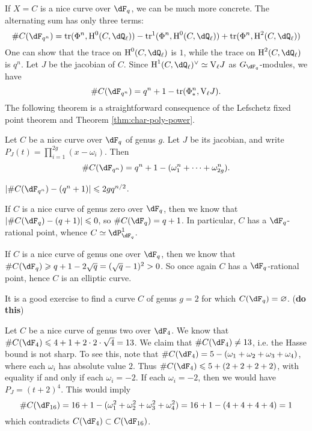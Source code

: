 If $X=C$ is a nice curve over $\dF_q$, we can be much more concrete. The 
alternating sum has only three terms:
\[
  \# C(\dF_{q^n}) = \trace(\Phi^n,\h^0(C,\dQ_\ell)) - \trace^1(\Phi^n,\h^0(C,\dQ_\ell)) + \trace(\Phi^n,\h^2(C,\dQ_\ell))
\]
One can show that the trace on $\h^0(C,\dQ_\ell)$ is $1$, while the trace on 
$\h^2(C,\dQ_\ell)$ is $q^n$. Let $J$ be the jacobian of $C$. Since 
$\h^1(C,\dQ_\ell)^\vee \simeq \vtate_\ell J$ as $G_{\dF_q}$-modules, we have 
\[
  \# C(\dF_{q^n}) = q^n+1 - \trace(\Phi_\ast^n, \vtate_\ell J) \text{.}
\]
The following theorem is a straightforward consequence of the Lefschetz fixed 
point theorem and Theorem \ref{thm:char-poly-power}. 

\begin{theorem}\label{thm:weil-curve}
Let $C$ be a nice curve over $\dF_q$ of genus $g$. Let $J$ be its jacobian, and 
write $P_J(t) = \prod_{i=1}^{2 g} (x-\omega_i)$. Then 
\[
  \# C(\dF_{q^n}) = q^n+1 - (\omega_1^n + \cdots + \omega_{2 g}^n) \text{.}
\]
\end{theorem}

\begin{corollary}
$|\# C(\dF_{q^n}) - (q^n+1)| \leqslant 2 g q^{n/2}$.
\end{corollary}






\begin{example}
If $C$ is a nice curve of genus zero over $\dF_q$, then we know that 
$|\# C(\dF_q) - (q+1)| \leqslant 0$, so $\# C(\dF_q) = q+1$. In particular, 
$C$ has a $\dF_q$-rational point, whence $C\simeq \dP_{\dF_q}^1$. 
\end{example}

\begin{example}
If $C$ is a nice curve of genus one over $\dF_q$, then we know that 
$\# C(\dF_q) \geqslant q+1-2\sqrt q = (\sqrt q-1)^2 > 0$. So once again $C$ has 
a $\dF_q$-rational point, hence $C$ is an elliptic curve. 
\end{example}

It is a good exercise to find a curve $C$ of genus $g=2$ for which 
$C(\dF_q)=\varnothing$. (\textbf{do this})

\begin{example}
Let $C$ be a nice curve of genus two over $\dF_4$. We know that 
$\# C(\dF_4) \leqslant 4+1+2\cdot 2\cdot \sqrt 4 = 13$. We claim that 
$\# C(\dF_4) \ne 13$, i.e. the Hasse bound is not sharp. To see this, note 
that $\# C(\dF_4) = 5 - (\omega_1+\omega_2+\omega_3+\omega_4)$, where each 
$\omega_i$ has absolute value $2$. Thus 
$\# C(\dF_4) \leqslant 5 + (2+2+2+2)$, with equality if and only if each 
$\omega_i=-2$. If each $\omega_i=-2$, then we would have 
$P_J=(t+2)^4$. This would imply 
\[
  \# C(\dF_{16}) = 16+1-(\omega_1^2+\omega_2^2+\omega_3^2+\omega_4^2) = 16+1-(4+4+4+4)=1
\]
which contradicts $C(\dF_4)\subset C(\dF_{16})$. 
\end{example}

